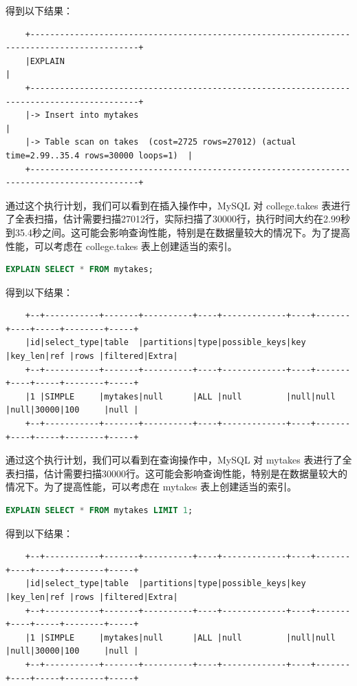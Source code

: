 \documentclass{article}
\begin{document}
	得到以下结果：
	
	\begin{verbatim}
	+--------------------------------------------------------------------------------------------+
	|EXPLAIN                                                                                     |
	+--------------------------------------------------------------------------------------------+
	|-> Insert into mytakes                                                                      |
	|-> Table scan on takes  (cost=2725 rows=27012) (actual time=2.99..35.4 rows=30000 loops=1)  |
	+--------------------------------------------------------------------------------------------+
	\end{verbatim}
	
	通过这个执行计划，我们可以看到在插入操作中，MySQL 对 college.takes 表进行了全表扫描，估计需要扫描27012行，实际扫描了30000行，执行时间大约在2.99秒到35.4秒之间。这可能会影响查询性能，特别是在数据量较大的情况下。为了提高性能，可以考虑在 college.takes 表上创建适当的索引。
	
	\begin{lstlisting}[language=sql, title=索引对查询性能的影响, tabsize=4]
	EXPLAIN SELECT * FROM mytakes;
	\end{lstlisting}
	
	得到以下结果：
	
	\begin{verbatim}
	+--+-----------+-------+----------+----+-------------+----+-------+----+-----+--------+-----+
	|id|select_type|table  |partitions|type|possible_keys|key |key_len|ref |rows |filtered|Extra|
	+--+-----------+-------+----------+----+-------------+----+-------+----+-----+--------+-----+
	|1 |SIMPLE     |mytakes|null      |ALL |null         |null|null   |null|30000|100     |null |
	+--+-----------+-------+----------+----+-------------+----+-------+----+-----+--------+-----+
	\end{verbatim}
	
	通过这个执行计划，我们可以看到在查询操作中，MySQL 对 mytakes 表进行了全表扫描，估计需要扫描30000行。这可能会影响查询性能，特别是在数据量较大的情况下。为了提高性能，可以考虑在 mytakes 表上创建适当的索引。
	
	\begin{lstlisting}[language=sql, title=索引对查询性能的影响, tabsize=4]
	EXPLAIN SELECT * FROM mytakes LIMIT 1;
	\end{lstlisting}
	
	得到以下结果：
	
	\begin{verbatim}
	+--+-----------+-------+----------+----+-------------+----+-------+----+-----+--------+-----+
	|id|select_type|table  |partitions|type|possible_keys|key |key_len|ref |rows |filtered|Extra|
	+--+-----------+-------+----------+----+-------------+----+-------+----+-----+--------+-----+
	|1 |SIMPLE     |mytakes|null      |ALL |null         |null|null   |null|30000|100     |null |
	+--+-----------+-------+----------+----+-------------+----+-------+----+-----+--------+-----+
	\end{verbatim}
	
\end{document}
